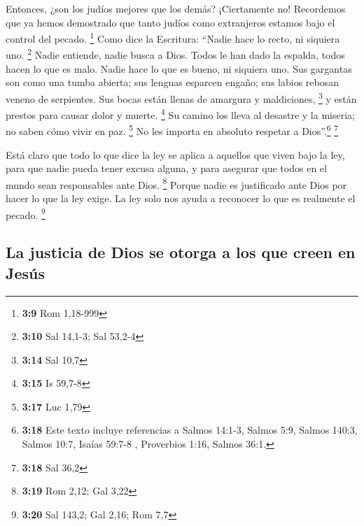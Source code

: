  Entonces, ¿son los judíos mejores que los demás?
¡Ciertamente no! Recordemos que ya hemos demostrado que tanto judíos
como extranjeros estamos bajo el control del pecado. \footnote{\textbf{3:9}
  Rom 1,18-999}  Como dice la Escritura: ``Nadie hace lo
recto, ni siquiera uno. \footnote{\textbf{3:10} Sal 14,1-3; Sal 53,2-4}
 Nadie entiende, nadie busca a Dios. 
Todos le han dado la espalda, todos hacen lo que es malo. Nadie hace lo
que es bueno, ni siquiera uno.  Sus gargantas son como
una tumba abierta; sus lenguas esparcen engaño; sus labios rebosan
veneno de serpientes.  Sus bocas están llenas de amargura
y maldiciones, \footnote{\textbf{3:14} Sal 10,7}  y están
prestos para causar dolor y muerte. \footnote{\textbf{3:15} Is 59,7-8}
 Su camino los lleva al desastre y la miseria;
 no saben cómo vivir en paz. \footnote{\textbf{3:17} Luc
  1,79}  No les importa en absoluto respetar a
Dios''.\footnote{\textbf{3:18} Este texto incluye referencias a Salmos
  14:1-3, Salmos 5:9, Salmos 140:3, Salmos 10:7, Isaías 59:7-8 ,
  Proverbios 1:16, Salmos 36:1.} \footnote{\textbf{3:18} Sal 36,2}

 Está claro que todo lo que dice la ley se aplica a
aquellos que viven bajo la ley, para que nadie pueda tener excusa
alguna, y para asegurar que todos en el mundo sean responsables ante
Dios. \footnote{\textbf{3:19} Rom 2,12; Gal 3,22}  Porque
nadie es justificado ante Dios por hacer lo que la ley exige. La ley
solo nos ayuda a reconocer lo que es realmente el pecado. \footnote{\textbf{3:20}
  Sal 143,2; Gal 2,16; Rom 7,7}

\hypertarget{la-justicia-de-dios-se-otorga-a-los-que-creen-en-jesuxfas}{%
\subsection{La justicia de Dios se otorga a los que creen en
Jesús}\label{la-justicia-de-dios-se-otorga-a-los-que-creen-en-jesuxfas}}


